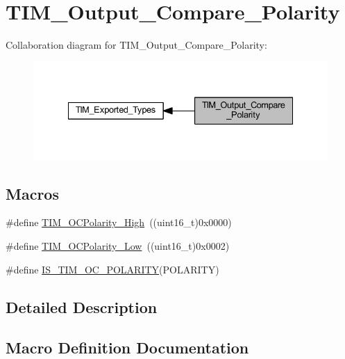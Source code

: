 \hypertarget{group___t_i_m___output___compare___polarity}{}\section{T\+I\+M\+\_\+\+Output\+\_\+\+Compare\+\_\+\+Polarity}
\label{group___t_i_m___output___compare___polarity}
Collaboration diagram for T\+I\+M\+\_\+\+Output\+\_\+\+Compare\+\_\+\+Polarity\+:
\nopagebreak
\begin{figure}[H]
\begin{center}
\leavevmode
\includegraphics[width=335pt]{group___t_i_m___output___compare___polarity}
\end{center}
\end{figure}
\subsection*{Macros}
\begin{DoxyCompactItemize}
\item 
\#define \hyperlink{group___t_i_m___output___compare___polarity_gaba2f2de6fd722b8973e0eddeb8644022}{T\+I\+M\+\_\+\+O\+C\+Polarity\+\_\+\+High}~((uint16\+\_\+t)0x0000)
\item 
\#define \hyperlink{group___t_i_m___output___compare___polarity_ga9f4b11953dbd2c6f836b6913469dcf54}{T\+I\+M\+\_\+\+O\+C\+Polarity\+\_\+\+Low}~((uint16\+\_\+t)0x0002)
\item 
\#define \hyperlink{group___t_i_m___output___compare___polarity_ga1c2ee68d587d4f48d935c82fe4c3fe1e}{I\+S\+\_\+\+T\+I\+M\+\_\+\+O\+C\+\_\+\+P\+O\+L\+A\+R\+I\+TY}(P\+O\+L\+A\+R\+I\+TY)
\end{DoxyCompactItemize}


\subsection{Detailed Description}


\subsection{Macro Definition Documentation}
\mbox{\label{group___t_i_m___output___compare___polarity_ga1c2ee68d587d4f48d935c82fe4c3fe1e}} 
